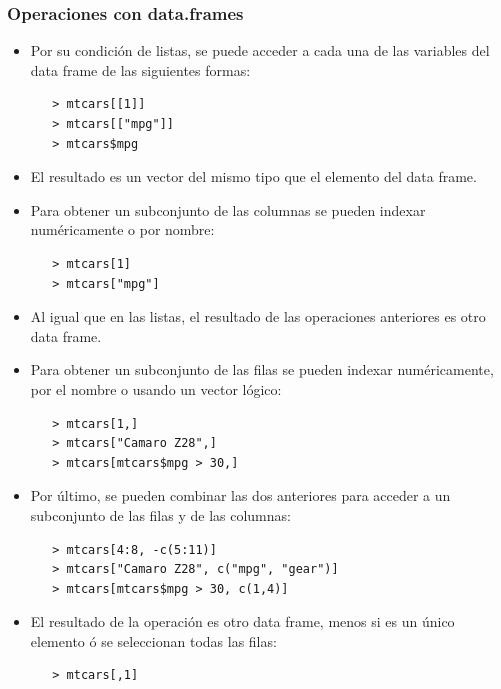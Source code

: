 \documentclass{beamer}
\begin{document}
\begin{frame}
\frametitle{Operaciones con data.frames}

\begin{itemize}
\item Por su condición de listas, se puede acceder a cada una de las variables del data frame de las siguientes formas:
\begin{verbatim}
   > mtcars[[1]]
   > mtcars[["mpg"]]
   > mtcars$mpg
\end{verbatim}
\item El resultado es un vector del mismo tipo que el elemento del data frame.
\item Para obtener un subconjunto de las columnas se pueden indexar numéricamente o por nombre:
\begin{verbatim}
   > mtcars[1]
   > mtcars["mpg"]
\end{verbatim}
\item Al igual que en las listas, el resultado de las operaciones anteriores es otro data frame.
\framebreak
\item Para obtener un subconjunto de las filas se pueden indexar numéricamente, por el nombre o usando un vector lógico:
\begin{verbatim}
   > mtcars[1,]
   > mtcars["Camaro Z28",]
   > mtcars[mtcars$mpg > 30,]
\end{verbatim}
\item Por último, se pueden combinar las dos anteriores para acceder a un subconjunto de las filas y de las columnas:
\begin{verbatim}
   > mtcars[4:8, -c(5:11)]
   > mtcars["Camaro Z28", c("mpg", "gear")]
   > mtcars[mtcars$mpg > 30, c(1,4)]
\end{verbatim}
\item El resultado de la operación es otro data frame, menos si es un único elemento ó se seleccionan todas las filas:
\begin{verbatim}
   > mtcars[,1]
\end{verbatim}
\end{itemize}
\end{frame}

\end{document}
